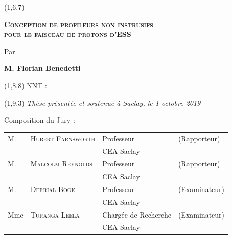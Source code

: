 \begin{titlepage}
	\begin{textblock}{14}(1,6.7)
		\begin{center}	
			\Large \textsc{\textcolor{SchoolColor}{
					\textbf{Conception de profileurs non instrusifs \\pour le faisceau de protons d’ESS}}}\par
			\large Par\par  \large \textbf{M. Florian Benedetti} \par
		\end{center}
	\end{textblock}
	
	\begin{textblock}{13}(1,8.8)
		NNT : 
	\end{textblock}
	
	\begin{textblock}{14}(1,9.3)
		\vspace{1.5cm}
		\hspace{1cm}\textit{Thèse présentée et soutenue à Saclay, le 1 octobre 2019}
		\vspace{0.5cm}
		\par
		\hspace{1cm}Composition du Jury :
		\begin{center}
			\begin{tabular}{llll}
				M.    & \textsc{Hubert Farnsworth} & Professeur              & (Rapporteur)            \\
				\null & \null                      & CEA Saclay              &                         \\   
				
				M.    & \textsc{Malcolm Reynolds}  & Professeur              & (Rapporteur)            \\
				\null & \null                      & CEA Saclay              &                         \\ 
				
				M.    & \textsc{Derrial Book}      & Professeur              & (Examinateur)           \\
				\null & \null                      & CEA Saclay              &                         \\ 
				
				Mme   & \textsc{Turanga Leela}     & Chargée de Recherche    & (Examinateur)           \\
				\null & \null                      & CEA Saclay              &                         \\ 
				

\end{tabular}
\end{center}
\end{textblock}
\end{titlepage}
